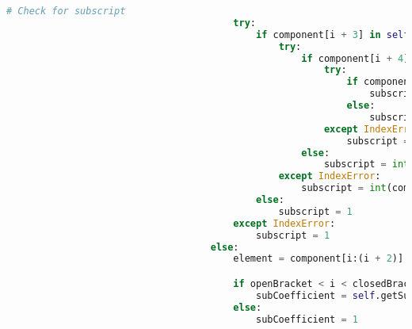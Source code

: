 \documentclass[a4paper,12pt]{article}
\begin{document}
\begin{lstlisting}[language=Python, caption=parseComponent method for finding elements]
                                        # Check for subscript
                                        try:
                                            if component[i + 3] in self.integers:
                                                try:
                                                    if component[i + 4] in self.integers:
                                                        try:
                                                            if component[i + 5] in self.integers:
                                                                subscript = int(component[(i + 3): (i + 6)])
                                                            else:
                                                                subscript = int(component[(i + 3): (i + 5)])
                                                        except IndexError:
                                                            subscript = int(component[(i + 3): (i + 5)])
                                                    else:
                                                        subscript = int(component[i + 3])
                                                except IndexError:
                                                    subscript = int(component[i + 3])
                                            else:
                                                subscript = 1
                                        except IndexError:
                                            subscript = 1
                                    else:
                                        element = component[i:(i + 2)]

                                        if openBracket < i < closedBracket:
                                            subCoefficient = self.getSubCoefficient(component)
                                        else:
                                            subCoefficient = 1


\end{lstlisting}
\end{document}
